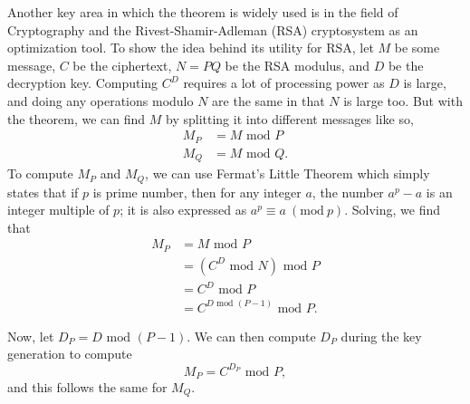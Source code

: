 \documentclass[12pt,a4paper,reqno,parskip=full]{amsart}
\numberwithin{equation}{section}
\theoremstyle{plain}
\newtheorem{conjecture}[subsection]{Conjecture}
\theoremstyle{definition}
\newcommand{\Mod}[1]{\ (\mathrm{mod}\ #1)}
\begin{document}
Another key area in which the theorem is widely used is in the field of Cryptography and the Rivest-Shamir-Adleman (RSA) cryptosystem as an optimization tool. To show the idea behind its utility for RSA, let $M$ be some message, $C$ be the ciphertext, $N=PQ$ be the RSA modulus, and $D$ be the decryption key. Computing $C^D$ requires a lot of processing power as $D$ is large, and doing any operations modulo $N$ are the same in that $N$ is large too. But with the theorem, we can find $M$ by splitting it into different messages like so,
\begin{align*}
	M_P &= M \text{ mod } P\\
	M_Q &= M \text{ mod } Q.
\end{align*}
To compute $M_P$ and $M_Q$, we can use Fermat's Little Theorem which simply states that if $p$ is  prime number, then for any integer $a$, the number $a^p -a$ is an integer multiple of $p$; it is also expressed as $a^p \equiv a \Mod{p}.$ Solving, we find that 
\begin{align*}
	M_P &= M \text{ mod } P\\
	&= (C^D \text{ mod } N) \text{ mod } P\\
	&= C^D \text{ mod } P\\
	&= C^{D \text{ mod } (P-1)} \text{ mod } P.
\end{align*}

Now, let $D_P = D \text{ mod } (P-1)$. We can then compute $D_P$ during the key generation to compute
\begin{equation*}
	M_P = C^{D_P} \text{ mod } P,
\end{equation*}
and this follows the same for $M_Q$\cite{Johann}. 


\end{document}
